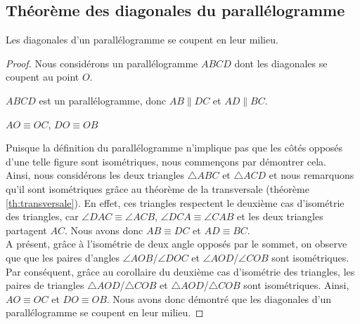 \documentclass[a4paper,12pt]{article}
\begin{document}
\subsection{Théorème des diagonales du parallélogramme}
\begin{theorem}\label{th:parallelogramme}
Les diagonales d'un parallélogramme se coupent en leur milieu.
\end{theorem}

\begin{proof}
Nous considérons un parallélogramme $ABCD$ dont les diagonales se coupent au point $O$.
\begin{hyp}
$ABCD$ est un parallélogramme, donc $AB \parallel DC$ et $AD \parallel BC$.
\end{hyp}

\begin{concl}
$AO \equiv OC$, $DO \equiv OB$
\end{concl}
Puisque la définition du parallélogramme n'implique pas que les côtés opposés d'une telle figure sont isométriques, nous commençons par démontrer cela. \\
Ainsi, nous considérons les deux triangles $\triangle ABC$ et $\triangle ACD$ et nous remarquons qu'il sont isométriques grâce au théorème de la transversale (théorème \ref{th:transversale}). En effet, ces triangles respectent le deuxième cas d'isométrie des triangles, car $\angle DAC \equiv \angle ACB$, $\angle DCA \equiv \angle CAB$ et les deux triangles partagent $AC$. Nous avons donc $AB \equiv DC$ et $AD \equiv BC$.\\

A présent, grâce à l'isométrie de deux angle opposés par le sommet, on observe que que les paires d'angles $\angle AOB$/$\angle DOC$ et $\angle AOD$/$\angle COB$ sont isométriques. Par conséquent, grâce au corollaire du deuxième cas d'isométrie des triangles, les paires de triangles $\triangle AOD$/$\triangle COB$ et $\triangle AOD$/$\triangle COB$ sont isométriques. Ainsi, $AO \equiv OC$ et $DO \equiv OB$. Nous avons donc démontré que les diagonales d'un parallélogramme se coupent en leur milieu.
\end{proof}
\end{document}
